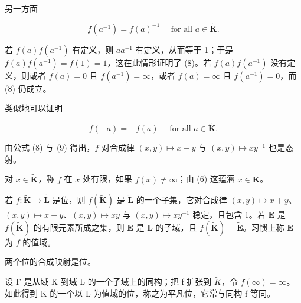 另一方面

\[
f (a ^ {- 1}) = f (a) ^ {- 1} \quad \text {   for   all   } a \in \tilde {\mathbf {K}}.\tag{8}
\]

若 \(f(a)f(a^{-1})\) 有定义，则 \(aa^{-1}\) 有定义，从而等于 1；于是 \(f(a)f(a^{-1}) = f(1) = 1\)，这在此情形证明了 (8)。若 \(f(a)f(a^{-1})\) 没有定义，则或者 \(f(a) = 0\) 且 \(f(a^{-1}) = \infty\)，或者 \(f(a) = \infty\) 且 \(f(a^{-1}) = 0\)，而 (8) 仍成立。

类似地可以证明

\[
f (- a) = - f (a) \quad \text {   for   all   } a \in \tilde {\mathbf {K}}.\tag{9}
\]

由公式 (8) 与 (9) 得出，\(f\) 对合成律 \((x, y) \mapsto x - y\) 与 \((x, y) \mapsto xy^{-1}\) 也是态射。

对 \(x \in \tilde{\mathbf{K}}\)，称 \(f\) 在 \(x\) 处有限，如果 \(f(x) \neq \infty\)；由 (6) 这蕴涵 \(x \in \mathbf{K}\)。

若 \(f \colon \tilde{\mathbf{K}} \to \tilde{\mathbf{L}}\) 是位，则 \(f(\tilde{\mathbf{K}})\) 是 \(\tilde{\mathbf{L}}\) 的一个子集，它对合成律 \((x, y) \mapsto x + y\)、\((x, y) \mapsto x - y\)、\((x, y) \mapsto xy\) 与 \((x, y) \mapsto xy^{-1}\) 稳定，且包含 1。若 \(\mathbf{E}\) 是 \(f(\tilde{\mathbf{K}})\) 的有限元素所成之集，则 \(\mathbf{E}\) 是 \(\mathbf{L}\) 的子域，且 \(f(\tilde{\mathbf{K}}) = \tilde{\mathbf{E}}\)。习惯上称 \(\mathbf{E}\) 为 \(f\) 的值域。

两个位的合成映射是位。

设 F 是从域 K 到域 L 的一个子域上的同构；把 f 扩张到 \(\tilde{K}\)，令 \(f(\infty) = \infty\)。如此得到 K 的一个以 L 为值域的位，称之为平凡位，它常与同构 f 等同。

